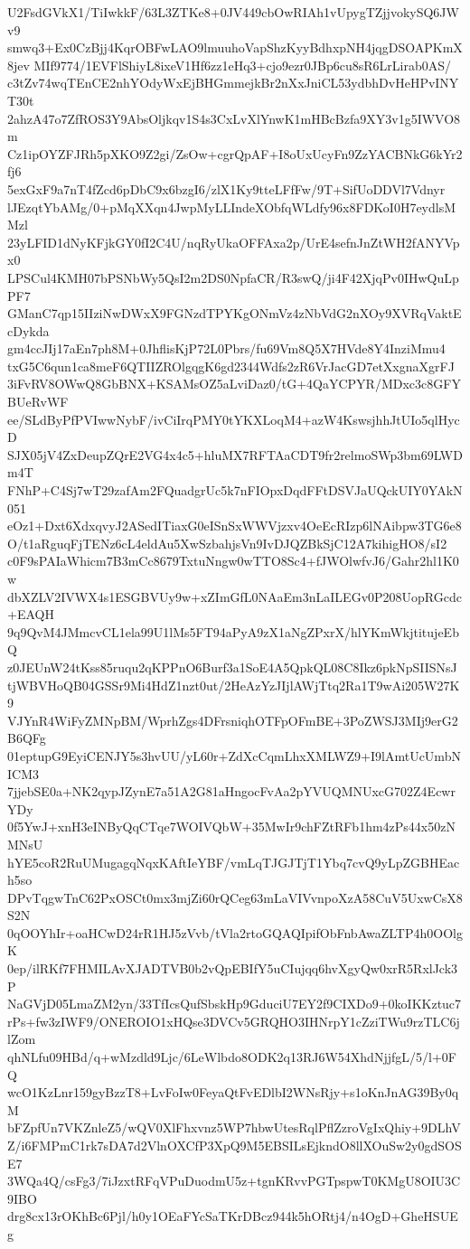 U2FsdGVkX1/TiIwkkF/63L3ZTKe8+0JV449cbOwRIAh1vUpygTZjjvokySQ6JWv9
smwq3+Ex0CzBjj4KqrOBFwLAO9lmuuhoVapShzKyyBdhxpNH4jqgDSOAPKmX8jev
MIf9774/1EVFlShiyL8ixeV1Hf6zz1eHq3+cjo9ezr0JBp6cu8sR6LrLirab0AS/
c3tZv74wqTEnCE2nhYOdyWxEjBHGmmejkBr2nXxJniCL53ydbhDvHeHPvINYT30t
2ahzA47o7ZfROS3Y9AbsOljkqv1S4s3CxLvXlYnwK1mHBcBzfa9XY3v1g5IWVO8m
Cz1ipOYZFJRh5pXKO9Z2gi/ZsOw+cgrQpAF+I8oUxUcyFn9ZzYACBNkG6kYr2fj6
5exGxF9a7nT4fZcd6pDbC9x6bzgI6/zlX1Ky9tteLFfFw/9T+SifUoDDVl7Vdnyr
lJEzqtYbAMg/0+pMqXXqn4JwpMyLLIndeXObfqWLdfy96x8FDKoI0H7eydlsMMzl
23yLFID1dNyKFjkGY0fI2C4U/nqRyUkaOFFAxa2p/UrE4sefnJnZtWH2fANYVpx0
LPSCul4KMH07bPSNbWy5QsI2m2DS0NpfaCR/R3swQ/ji4F42XjqPv0IHwQuLpPF7
GManC7qp15IIziNwDWxX9FGNzdTPYKgONmVz4zNbVdG2nXOy9XVRqVaktEcDykda
gm4ccJIj17aEn7ph8M+0JhflisKjP72L0Pbrs/fu69Vm8Q5X7HVde8Y4InziMmu4
txG5C6qun1ca8meF6QTIIZROlgqgK6gd2344Wdfs2zR6VrJacGD7etXxgnaXgrFJ
3iFvRV8OWwQ8GbBNX+KSAMsOZ5aLviDaz0/tG+4QaYCPYR/MDxc3c8GFYBUeRvWF
ee/SLdByPfPVIwwNybF/ivCiIrqPMY0tYKXLoqM4+azW4KswsjhhJtUIo5qlHycD
SJX05jV4ZxDeupZQrE2VG4x4c5+hluMX7RFTAaCDT9fr2relmoSWp3bm69LWDm4T
FNhP+C4Sj7wT29zafAm2FQuadgrUc5k7nFIOpxDqdFFtDSVJaUQckUIY0YAkN051
eOz1+Dxt6XdxqvyJ2ASedITiaxG0eISnSxWWVjzxv4OeEcRIzp6lNAibpw3TG6e8
O/t1aRguqFjTENz6cL4eldAu5XwSzbahjsVn9IvDJQZBkSjC12A7kihigHO8/sI2
c0F9sPAIaWhicm7B3mCc8679TxtuNngw0wTTO8Sc4+fJWOlwfvJ6/Gahr2hl1K0w
dbXZLV2IVWX4s1ESGBVUy9w+xZImGfL0NAaEm3nLaILEGv0P208UopRGcdc+EAQH
9q9QvM4JMmcvCL1ela99U1lMs5FT94aPyA9zX1aNgZPxrX/hlYKmWkjtitujeEbQ
z0JEUnW24tKss85ruqu2qKPPnO6Burf3a1SoE4A5QpkQL08C8Ikz6pkNpSIISNsJ
tjWBVHoQB04GSSr9Mi4HdZ1nzt0ut/2HeAzYzJIjlAWjTtq2Ra1T9wAi205W27K9
VJYnR4WiFyZMNpBM/WprhZgs4DFrsniqhOTFpOFmBE+3PoZWSJ3MIj9erG2B6QFg
01eptupG9EyiCENJY5s3hvUU/yL60r+ZdXcCqmLhxXMLWZ9+I9lAmtUcUmbNICM3
7jjebSE0a+NK2qypJZynE7a51A2G81aHngocFvAa2pYVUQMNUxcG702Z4EcwrYDy
0f5YwJ+xnH3eINByQqCTqe7WOIVQbW+35MwIr9chFZtRFb1hm4zPs44x50zNMNsU
hYE5coR2RuUMugagqNqxKAftIeYBF/vmLqTJGJTjT1Ybq7cvQ9yLpZGBHEach5so
DPvTqgwTnC62PxOSCt0mx3mjZi60rQCeg63mLaVIVvnpoXzA58CuV5UxwCsX8S2N
0qOOYhIr+oaHCwD24rR1HJ5zVvb/tVla2rtoGQAQIpifObFnbAwaZLTP4h0OOlgK
0ep/ilRKf7FHMILAvXJADTVB0b2vQpEBIfY5uCIujqq6hvXgyQw0xrR5RxlJck3P
NaGVjD05LmaZM2yn/33TfIcsQufSbskHp9GduciU7EY2f9CIXDo9+0koIKKztuc7
rPs+fw3zIWF9/ONEROIO1xHQse3DVCv5GRQHO3IHNrpY1cZziTWu9rzTLC6jlZom
qhNLfu09HBd/q+wMzdld9Ljc/6LeWlbdo8ODK2q13RJ6W54XhdNjjfgL/5/l+0FQ
wcO1KzLnr159gyBzzT8+LvFoIw0FeyaQtFvEDlbI2WNsRjy+s1oKnJnAG39By0qM
bFZpfUn7VKZnleZ5/wQV0XlFhxvnz5WP7hbwUtesRqlPflZzroVgIxQhiy+9DLhV
Z/i6FMPmC1rk7sDA7d2VlnOXCfP3XpQ9M5EBSILsEjkndO8llXOuSw2y0gdSOSE7
3WQa4Q/csFg3/7iJzxtRFqVPuDuodmU5z+tgnKRvvPGTpspwT0KMgU8OIU3C9IBO
drg8cx13rOKhBc6Pjl/h0y1OEaFYcSaTKrDBcz944k5hORtj4/n4OgD+GheHSUEg
